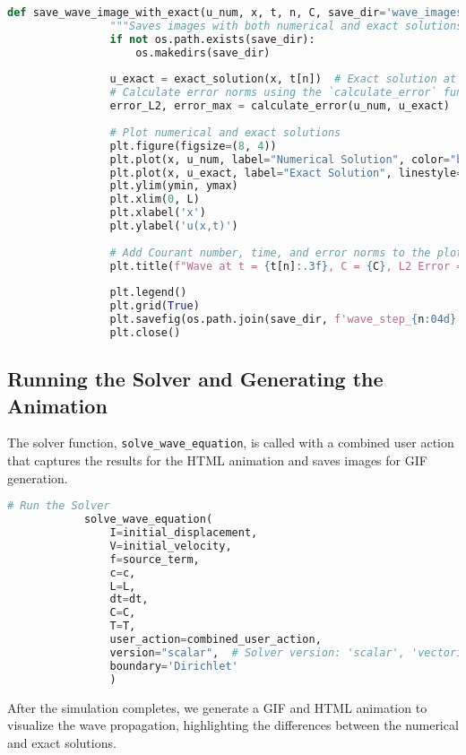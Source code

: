 \documentclass{article}
\begin{document}
		 \begin{lstlisting}[language=Python]
		 	def save_wave_image_with_exact(u_num, x, t, n, C, save_dir='wave_images', ymin=-0.01, ymax=0.01):
			 	"""Saves images with both numerical and exact solutions at each time step."""
			 	if not os.path.exists(save_dir):
				 	os.makedirs(save_dir)
				 	
			 	u_exact = exact_solution(x, t[n])  # Exact solution at this time step
			 	# Calculate error norms using the `calculate_error` function
			 	error_L2, error_max = calculate_error(u_num, u_exact)
			 	
			 	# Plot numerical and exact solutions
			 	plt.figure(figsize=(8, 4))
			 	plt.plot(x, u_num, label="Numerical Solution", color="blue")
			 	plt.plot(x, u_exact, label="Exact Solution", linestyle="--", color="red")
			 	plt.ylim(ymin, ymax)
			 	plt.xlim(0, L)
			 	plt.xlabel('x')
			 	plt.ylabel('u(x,t)')
			 	
			 	# Add Courant number, time, and error norms to the plot title
			 	plt.title(f"Wave at t = {t[n]:.3f}, C = {C}, L2 Error = {error_L2:.5e}, Max Error = {error_max:.5e}")
			 	
			 	plt.legend()
			 	plt.grid(True)
			 	plt.savefig(os.path.join(save_dir, f'wave_step_{n:04d}.png'))
			 	plt.close()
		 \end{lstlisting}
		 
		 \subsection{Running the Solver and Generating the Animation}
		 
		 The solver function, \texttt{solve\_wave\_equation}, is called with a combined user action that captures the results for the HTML animation and saves images for GIF generation.
		 
		 \begin{lstlisting}[language=Python]
		 	# Run the Solver
		 	solve_wave_equation(
			 	I=initial_displacement,
			 	V=initial_velocity,
			 	f=source_term,
			 	c=c,
			 	L=L,
			 	dt=dt,
			 	C=C,
			 	T=T,
			 	user_action=combined_user_action,
			 	version="scalar",  # Solver version: 'scalar', 'vectorized', or 'vectorized2'
			 	boundary='Dirichlet'
			 	)
		 \end{lstlisting}
		 
		 After the simulation completes, we generate a GIF and HTML animation to visualize the wave propagation, highlighting the differences between the numerical and exact solutions.
		 
\end{document}
